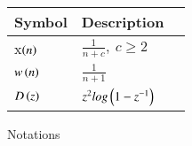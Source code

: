 \centering
\setlength{\arrayrulewidth}{0.3mm}
\setlength{\tabcolsep}{15pt}
\renewcommand{\arraystretch}{1.5}
\begin{tabular}{ |p{1cm}|p{2cm}|p{2cm}| }
\hline
Symbol & Description \\
\hline
x$\left(n\right)$ &  $\frac{1}{n+c}, \: c \geq 2$ \\
\hline
$w\left(n\right)$ &  $\frac{1}{n+1}$ \\
\hline
$D\left(z\right)$ & $z^2 log\left(1-z^{-1}\right)$\\
\hline
\end{tabular}
\caption{Notations}
